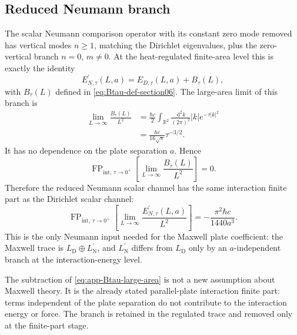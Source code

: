 \documentclass[11pt]{article}
\providecommand{\R}{\mathbb{R}}
\providecommand{\dd}{\,\mathrm{d}}
\providecommand{\hbarc}{\hbar c}
\providecommand{\FP}{\operatorname{FP}}
\providecommand{\abs}[1]{\left\lvert #1\right\rvert}
\providecommand{\LD}{L_{\mathrm D}}
\providecommand{\LNp}{L_{\mathrm N}^{\prime}}
\providecommand{\EDtau}{E_{D,\tau}}
\providecommand{\ENtau}{E_{N,\tau}^{\prime}}
\providecommand{\Btau}{B_{\tau}}
\numberwithin{equation}{section}
\begin{document}
\subsection{Reduced Neumann branch}
\label{subsec:app-reduced-neumann-branch}

The scalar Neumann comparison operator with its constant zero mode removed has
vertical modes \(n\ge1\), matching the Dirichlet eigenvalues, plus the
zero-vertical branch \(n=0\), \(m\ne0\).  At the heat-regulated finite-area
level this is exactly the identity
\[
    \ENtau(L,a)=\EDtau(L,a)+\Btau(L),
\]
with \(\Btau(L)\) defined in \eqref{eq:Btau-def-section06}.  The large-area
limit of this branch is
\begin{align}
\label{eq:app-Btau-large-area}
    \lim_{L\to\infty}\frac{\Btau(L)}{L^2}
    &=
    \frac{\hbarc}{2}
    \int_{\R^2}\frac{\dd^2k}{(2\pi)^2}\abs{k}e^{-\tau\abs{k}^2}  \\
    &=
    \frac{\hbarc}{16\sqrt\pi}\tau^{-3/2}.
\end{align}
It has no dependence on the plate separation \(a\).  Hence
\begin{equation}
\label{eq:app-Btau-FP-zero}
    \FP_{\mathrm{int},\,\tau\to0^+}
    \left[
        \lim_{L\to\infty}\frac{\Btau(L)}{L^2}
    \right]
    =0.
\end{equation}
Therefore the reduced Neumann scalar channel has the same interaction finite
part as the Dirichlet scalar channel:
\begin{equation}
\label{eq:app-Neumann-FP-equals-Dirichlet}
    \FP_{\mathrm{int},\,\tau\to0^+}
    \left[
        \lim_{L\to\infty}\frac{\ENtau(L,a)}{L^2}
    \right]
    =
    -\frac{\pi^2\hbarc}{1440a^3}.
\end{equation}
This is the only Neumann input needed for the Maxwell plate coefficient: the
Maxwell trace is \(\LD\oplus\LNp\), and \(\LNp\) differs from \(\LD\) only by
an \(a\)-independent branch at the interaction-energy level.

\begin{remark}
\label{rem:app-no-extra-assumption}
The subtraction of \eqref{eq:app-Btau-large-area} is not a new assumption about
Maxwell theory.  It is the already stated parallel-plate interaction finite
part: terms independent of the plate separation do not contribute to the
interaction energy or force.  The branch is retained in the regulated trace and
removed only at the finite-part stage.
\end{remark}
\end{document}
